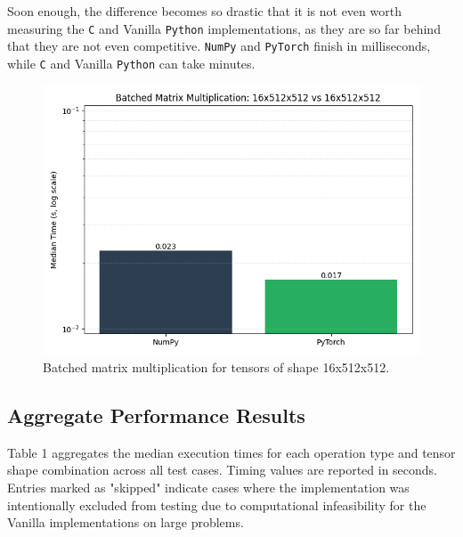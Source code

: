 \documentclass[a4paper,12pt]{article}
\begin{document}
Soon enough, the difference becomes so drastic that it is not even worth
measuring the \texttt{C} and Vanilla \texttt{Python} implementations, as they
are so far behind that they are not even competitive. \texttt{NumPy} and \texttt{PyTorch} finish in milliseconds, while \texttt{C} and Vanilla \texttt{Python} can take minutes.

\begin{figure}[H]
  \centering
  \includegraphics[width=0.7\linewidth]{results/bar/BMM_16x512x512_16x512x512.png}
  \caption{Batched matrix multiplication for tensors of shape 16x512x512.}
  \label{fig:five}
\end{figure}

\subsection{Aggregate Performance Results}

Table 1 aggregates the median execution times for each operation type and tensor shape combination across all test cases. Timing values are reported in seconds. Entries marked as "skipped" indicate cases where the implementation was intentionally excluded from testing due to computational infeasibility for the Vanilla implementations on large problems.
\end{document}
